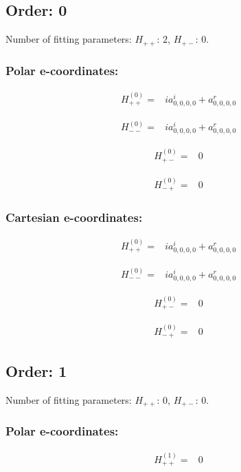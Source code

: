 \documentclass[fleqn]{article}
\begin{document}
\subsection{Order: 0}
Number of fitting parameters: $H_{++}$: $2$, $H_{+-}$: $0$.
\subsubsection*{Polar e-coordinates:}

\begin{align*}
H_{++}^{(0)}=&i a^{i}_{0,0,0,0} + a^{r}_{0,0,0,0}
\end{align*}

\begin{align*}
H_{--}^{(0)}=&i a^{i}_{0,0,0,0} + a^{r}_{0,0,0,0}
\end{align*}

\begin{align*}
H_{+-}^{(0)}=&0
\end{align*}

\begin{align*}
H_{-+}^{(0)}=&0
\end{align*}
\subsubsection*{Cartesian e-coordinates:}

\begin{align*}
H_{++}^{(0)}=& i a^{i}_{0,0,0,0} + a^{r}_{0,0,0,0}
\end{align*}

\begin{align*}
H_{--}^{(0)}=& i a^{i}_{0,0,0,0} + a^{r}_{0,0,0,0}
\end{align*}

\begin{align*}
H_{+-}^{(0)}=&0
\end{align*}

\begin{align*}
H_{-+}^{(0)}=&0
\end{align*}
\subsection{Order: 1}
Number of fitting parameters: $H_{++}$: $0$, $H_{+-}$: $0$.
\subsubsection*{Polar e-coordinates:}

\begin{align*}
H_{++}^{(1)}=&0
\end{align*}
\end{document}
